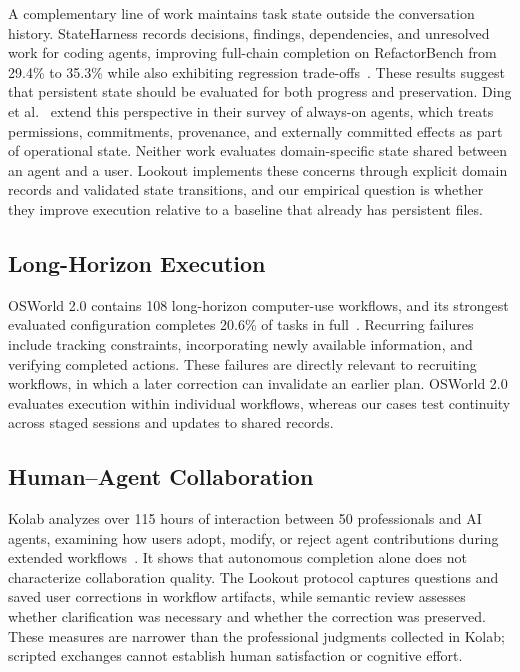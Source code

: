 \documentclass[twocolumn]{article}
\begin{document}
A complementary line of work maintains task state outside the conversation history. StateHarness records decisions, findings, dependencies, and unresolved work for coding agents, improving full-chain completion on RefactorBench from 29.4\% to 35.3\% while also exhibiting regression trade-offs~\cite{stateharness}. These results suggest that persistent state should be evaluated for both progress and preservation. Ding et al.~\cite{alwayson} extend this perspective in their survey of always-on agents, which treats permissions, commitments, provenance, and externally committed effects as part of operational state. Neither work evaluates domain-specific state shared between an agent and a user. Lookout implements these concerns through explicit domain records and validated state transitions, and our empirical question is whether they improve execution relative to a baseline that already has persistent files.

\subsection{Long-Horizon Execution}
OSWorld 2.0 contains 108 long-horizon computer-use workflows, and its strongest evaluated configuration completes 20.6\% of tasks in full~\cite{osworld}. Recurring failures include tracking constraints, incorporating newly available information, and verifying completed actions. These failures are directly relevant to recruiting workflows, in which a later correction can invalidate an earlier plan. OSWorld 2.0 evaluates execution within individual workflows, whereas our cases test continuity across staged sessions and updates to shared records.

\subsection{Human--Agent Collaboration}
Kolab analyzes over 115 hours of interaction between 50 professionals and AI agents, examining how users adopt, modify, or reject agent contributions during extended workflows~\cite{kolab}. It shows that autonomous completion alone does not characterize collaboration quality. The Lookout protocol captures questions and saved user corrections in workflow artifacts, while semantic review assesses whether clarification was necessary and whether the correction was preserved. These measures are narrower than the professional judgments collected in Kolab; scripted exchanges cannot establish human satisfaction or cognitive effort.
\end{document}
